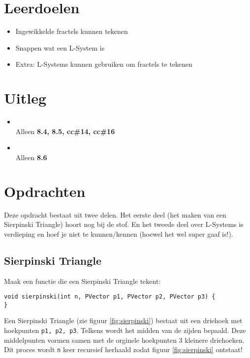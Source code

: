 \documentclass[../syllabus.tex]{subfiles}
\begin{document}
\section{Leerdoelen}
\begin{itemize}
    \item Ingewikkelde fractels kunnen tekenen
    \item Snappen wat een L-System is
    \item Extra: L-Systems kunnen gebruiken om fractels te tekenen
\end{itemize}

\section{Uitleg}
\begin{itemize}
    \item {}\\
    Alleen \textbf{8.4, 8.5, cc\#14, cc\#16}\\
    \item {}\\
    Alleen \textbf{8.6}\\
\end{itemize}

\newpage
\section{Opdrachten}
Deze opdracht bestaat uit twee delen. Het eerste deel (het maken van een Sierpinski Triangle) hoort nog bij de stof. En het tweede deel over L-Systems is verdieping en hoef je niet te kunnen/kennen (hoewel het wel super gaaf is!).

\subsection{Sierpinski Triangle}
Maak een functie die een Sierpinski Triangle tekent:
\begin{lstlisting}
void sierpinski(int n, PVector p1, PVector p2, PVector p3) {
}
\end{lstlisting}
Een Sierpinski Triangle (zie figuur \ref{fig:sierpinski}) bestaat uit een driehoek met hoekpunten \texttt{p1, p2, p3}. Telkens wordt het midden van de zijden bepaald. Deze middelpunten vormen samen met de orginele hoekpunten 3 kleinere driehoeken. Dit proces wordt \texttt{n} keer recursief herhaald zodat figuur \ref{fig:sierpinski} ontstaat!
\end{document}
